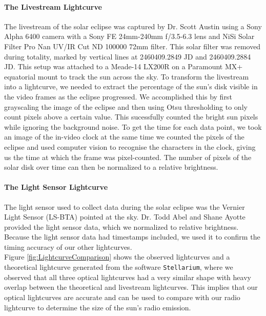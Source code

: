 \paragraph{The Livestream Lightcurve}
The livestream of the solar eclipse was captured by Dr. Scott Austin using a Sony Alpha 6400 camera with a Sony FE 24mm-240mm f/3.5-6.3 lens and NiSi Solar Filter Pro Nan UV/IR Cut ND 100000 72mm filter.
This solar filter was removed during totality, marked by vertical lines at 2460409.2849 JD and 2460409.2884 JD.
This setup was attached to a Meade-14 LX200R on a Paramount MX+ equatorial mount to track the sun across the sky.
To transform the livestream into a lightcurve, we needed to extract the percentage of the sun's disk visible in the video frames as the eclipse progressed.
We accomplished this by first grayscaling the image of the eclipse and then using Otsu thresholding \cite{otsu_1979} to only count pixels above a certain value.
This sucessfully counted the bright sun pixels while ignoring the background noise.
To get the time for each data point, we took an image of the in-video clock at the same time we counted the pixels of the eclipse and used computer vision to recognise the characters in the clock, giving us the time at which the frame was pixel-counted.
The number of pixels of the solar disk over time can then be normalized to a relative brightness.
\paragraph{The Light Sensor Lightcurve}
The light sensor used to collect data during the solar eclipse was the Vernier Light Sensor (LS-BTA) pointed at the sky.
Dr. Todd Abel and Shane Ayotte provided the light sensor data, which we normalized to relative brightness.
Because the light sensor data had timestamps included, we used it to confirm the timing accuracy of our other lightcurves.
\\
Figure \ref{fig:LightcurveComparison} shows the observed lightcurves and a theoretical lightcurve generated from the software \texttt{Stellarium}\cite{zotti_simulated_2020}, where we observed that all three optical lightcurves had a very similar shape with heavy overlap between the theoretical and livestream lightcurves.
This implies that our optical lightcurves are accurate and can be used to compare with our radio lightcurve to determine the size of the sun's radio emission.
